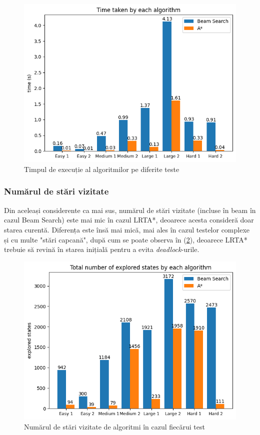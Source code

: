 \documentclass{article}
\begin{document}
\begin{figure}
    \includegraphics[scale=0.8]{plots/solution/time.png}
    \caption{Timpul de execuție al algoritmilor pe diferite teste}
    \label{fig:time}
\end{figure}

\subsubsection*{Numărul de stări vizitate}
Din aceleași considerente ca mai sus, numărul de stări vizitate (incluse în beam
în cazul Beam Search) este mai mic în cazul LRTA*, deoarece acesta consideră 
doar starea curentă. Diferența este însă mai mică, mai ales în cazul testelor 
complexe și cu multe "stări capcană", după cum se poate observa în 
(\ref{fig:states}), deoarece LRTA* trebuie să revină în starea inițială pentru
a evita \textit{deadlock}-urile.

\begin{figure}
    \includegraphics[scale=0.8]{plots/solution/states.png}
    \caption{Numărul de stări vizitate de algoritmi în cazul fiecărui test}
    \label{fig:states}
\end{figure}
\end{document}
